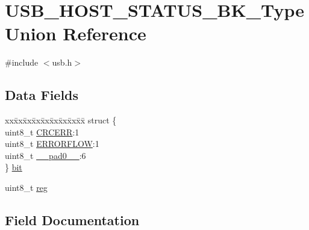 \hypertarget{union_u_s_b___h_o_s_t___s_t_a_t_u_s___b_k___type}{}\section{U\+S\+B\+\_\+\+H\+O\+S\+T\+\_\+\+S\+T\+A\+T\+U\+S\+\_\+\+B\+K\+\_\+\+Type Union Reference}
\label{union_u_s_b___h_o_s_t___s_t_a_t_u_s___b_k___type}


{\ttfamily \#include $<$usb.\+h$>$}

\subsection*{Data Fields}
\begin{DoxyCompactItemize}
\item 
\begin{tabbing}
xx\=xx\=xx\=xx\=xx\=xx\=xx\=xx\=xx\=\kill
struct \{\\
\>uint8\_t \mbox{\hyperlink{union_u_s_b___h_o_s_t___s_t_a_t_u_s___b_k___type_a9a5185c85ce19eb51127ea4207839f1d}{CRCERR}}:1\\
\>uint8\_t \mbox{\hyperlink{union_u_s_b___h_o_s_t___s_t_a_t_u_s___b_k___type_ab1509dd1f780da84c5187a5d977aca9a}{ERRORFLOW}}:1\\
\>uint8\_t \mbox{\hyperlink{union_u_s_b___h_o_s_t___s_t_a_t_u_s___b_k___type_a8b4eebe79ded0459acec2f4950102ba3}{\_\_pad0\_\_}}:6\\
\} \mbox{\hyperlink{union_u_s_b___h_o_s_t___s_t_a_t_u_s___b_k___type_aec727d8e239be15eb4eacb628edc1101}{bit}}\\

\end{tabbing}\item 
uint8\+\_\+t \mbox{\hyperlink{union_u_s_b___h_o_s_t___s_t_a_t_u_s___b_k___type_a9428adc9af4653a2050e2536b55dec8d}{reg}}
\end{DoxyCompactItemize}


\subsection{Field Documentation}
\mbox{\label{union_u_s_b___h_o_s_t___s_t_a_t_u_s___b_k___type_a8b4eebe79ded0459acec2f4950102ba3}} 
